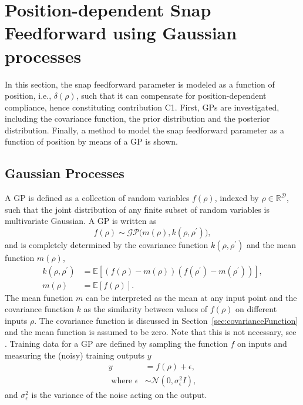 \documentclass[letterpaper, 10 pt, conference]{ieeeconf}  %
\begin{document}
\section{Position-dependent Snap Feedforward using Gaussian processes}
\label{sec:GPSnap}
In this section, the snap feedforward parameter is modeled as a function of position, i.e., $\delta(\rho)$, such that it can compensate for position-dependent compliance, hence constituting contribution C1. First, GPs are investigated, including the covariance function, the prior distribution and the posterior distribution. Finally, a method to model the snap feedforward parameter as a function of position by means of a GP is shown.
\subsection{Gaussian Processes}
A GP is defined as a collection of random variables $f(\rho)$, indexed by $\rho \in \mathbb{R}^{\mathcal{D}}$, such that the joint distribution of any finite subset of random variables is multivariate Gaussian. A GP is written as
\begin{equation}
	\label{eq:GPDef}
	f(\rho) \sim \mathcal{GP}\big(m(\rho),k(\rho,\rho^\prime)\big),
\end{equation}
and is completely determined by the covariance function $k(\rho,\rho^\prime)$ and the mean function $m(\rho)$,
\begin{equation}
	\label{eq:meanAndCovFunction}
	\begin{aligned}
		k\left(\rho, \rho^{\prime}\right) &=\mathbb{E}\left[(f(\rho)-m(\rho))\left(f\left(\rho^{\prime}\right)-m\left(\rho^{\prime}\right)\right)\right], \\
		m(\rho) &=\mathbb{E}[f(\rho)].
	\end{aligned}
\end{equation}
The mean function $m$ can be interpreted as the mean at any input point and the covariance function $k$ as the similarity between values of $f(\rho)$ on different inputs $\rho$. The covariance function is discussed in Section~\ref{sec:covarianceFunction} and the mean function is assumed to be zero. Note that this is not necessary, see \cite[Section~2.7]{Rasmussen2004}. Training data for a GP are defined by sampling the function $f$ on inputs and measuring the (noisy) training outputs $y$
\begin{equation}
	\label{eq:functionSamples}
	\begin{aligned}
		y &=f(\rho)+\epsilon, \\
		\text { where } \epsilon & \sim \mathcal{N}\left(0, \sigma_{\epsilon}^{2} I\right),
	\end{aligned}
\end{equation}
and $\sigma_\epsilon^2$ is the variance of the noise acting on the output.
\end{document}
